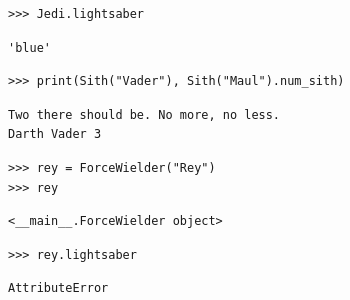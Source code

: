 \begin{lstlisting}
>>> Jedi.lightsaber 
\end{lstlisting}
\begin{solution}[.2in]
\begin{lstlisting}
'blue'
\end{lstlisting}
\end{solution}

\begin{lstlisting}
>>> print(Sith("Vader"), Sith("Maul").num_sith)
\end{lstlisting}
\begin{solution}[.2in]
\begin{lstlisting}
Two there should be. No more, no less.
Darth Vader 3
\end{lstlisting}
\end{solution}

\begin{lstlisting}
>>> rey = ForceWielder("Rey")
>>> rey
\end{lstlisting}
\begin{solution}[.2in]
\begin{lstlisting}
<__main__.ForceWielder object>
\end{lstlisting}
\end{solution}

\begin{lstlisting}
>>> rey.lightsaber
\end{lstlisting}
\begin{solution}
\begin{lstlisting}
AttributeError
\end{lstlisting}
\end{solution}

